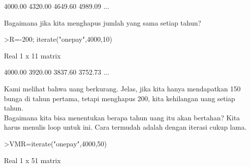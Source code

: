 \documentclass[a4paper,10pt]{article}
\begin{document}
\begin{eulernotebook}
\begin{eulercomment}
\begin{eulercomment}
\begin{eulercomment}
\begin{eulercomment}
\begin{eulercomment}
\begin{eulercomment}
\begin{euleroutput}
      4000.00     4320.00     4649.60     4989.09     ...
\end{euleroutput}
\begin{eulercomment}
Bagaimana jika kita menghapus jumlah yang sama setiap tahun?
\end{eulercomment}
\begin{eulerprompt}
>R=-200; iterate("onepay",4000,10)
\end{eulerprompt}
\begin{euleroutput}
  Real 1 x 11 matrix
  
      4000.00     3920.00     3837.60     3752.73     ...
\end{euleroutput}
\begin{eulercomment}
Kami melihat bahwa uang berkurang. Jelas, jika kita hanya mendapatkan
150 bunga di tahun pertama, tetapi menghapus 200, kita kehilangan uang
setiap tahun.\\
Bagaimana kita bisa menentukan berapa tahun uang itu akan bertahan?
Kita harus menulis loop untuk ini. Cara termudah adalah dengan iterasi
cukup lama.
\end{eulercomment}
\begin{eulerprompt}
>VMR=iterate("onepay",4000,50)
\end{eulerprompt}
\begin{euleroutput}
  Real 1 x 51 matrix
  

\end{euleroutput}
\end{eulercomment}
\end{eulercomment}
\end{eulercomment}
\end{eulercomment}
\end{eulercomment}
\end{eulercomment}
\end{eulernotebook}
\end{document}
